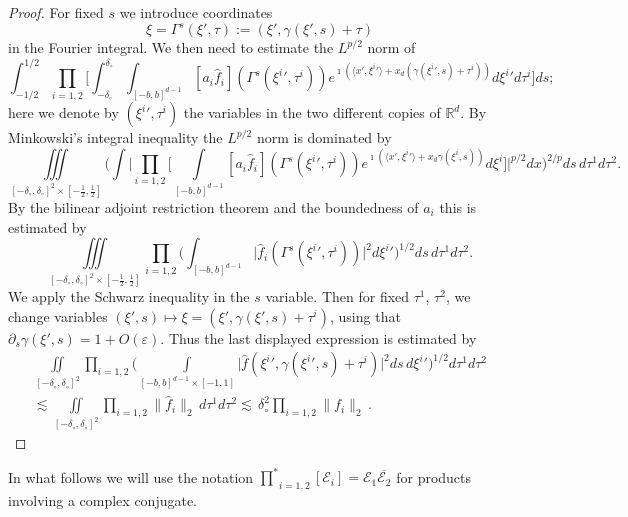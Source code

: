 \documentclass[11pt]{amsart}
\theoremstyle{definition}
\numberwithin{theorem}{section}
\numberwithin{definition}{section}
\def\im{\imath}
\def\prodstartext{{\prod^{*}}_{\!\!i=1,2}}
\def\inn#1#2{\langle#1,#2\rangle}
\newcommand{\note}[1]{\footnote{\texttt{\Small #1}}}
\def\inn#1#2{\langle#1,#2\rangle}
\def\lc{\lesssim}
\def\eps{\varepsilon}
\def\bbR{{\mathbb {R}}}
\def\cE{{\mathcal {E}}}
\begin{document}
\begin{proof} For fixed $s$ we introduce coordinates
 $$\xi=\Gamma^s(\xi',\tau):=(\xi', \gamma(\xi',s)+\tau)$$
in the Fourier integral.
We then need to  estimate the $L^{p/2}$ norm of
$$
\int_{-1/2}^{1/2} \prod_{i=1,2} \biggl[ \int_{-\delta_\circ}^{\delta_\circ}
\int_{[-b,b]^{d-1}}
[a_i\widehat f_i](\Gamma^s({\xi^{i}}',\tau^i))
e^{\im(\inn{x'}{{\xi^i}'}+ x_d( \gamma({{\xi^{i}}'},s)+\tau^i))} d{\xi^{i}}'
d\tau^i\biggr] ds;
$$
here we denote by $({\xi^{i}}',\tau^i)$
the variables  in the two different copies of $\bbR^d$.
By  Minkowski's integral inequality the $L^{p/2}$ norm is dominated by
$$
\iiint\limits_{[-\delta_\circ,\delta_\circ]^2\times [-\frac 12,\frac 12]}
 \Big(\int \Big| \prod_{i=1,2}\Big[\int\limits_{[-b,b]^{d-1}}
 [a_i
\widehat  f_i](\Gamma^s({\xi^{i}}',\tau^i))
e^{\im(\inn{x'}{{\xi^i}'}+x_d \gamma(\xi^{i},s))}
d\xi^i\Big]
\Big|^{p/2} dx\Big)^{2/p}ds \,d\tau^1d\tau^2.
$$
By the bilinear adjoint restriction theorem and the boundedness of $a_i$
this is estimated by
$$\iiint\limits_{[-\delta_\circ,\delta_\circ]^2\times [-\frac 12,\frac 12]}
\prod_{i=1,2}
\Big(\int_{[-b,b]^{d-1}}\big| \widehat f_i(\Gamma^s({\xi^{i}}',\tau^i))
\big|^2 d{\xi^i}'\Big)^{1/2} ds\,d\tau^1 d\tau^2.
$$
We apply the Schwarz inequality in the $s$ variable. Then
 for
fixed $\tau^1$, $\tau^2$, we
 change
 variables $(\xi',s)\mapsto \xi= (\xi',  \gamma(\xi',s)+\tau^i)$, using that
 $\partial_s \gamma(\xi',s)= 1+O(\eps)$.
Thus the last displayed expression is estimated by
\begin{multline*}
 \iint\limits_{[-\delta_\circ,\delta_\circ]^2}
\prod_{i=1,2}
\Big(\int\limits_{[-b,b]^{d-1}\times[-1,1]} \big |\widehat f({\xi^i}',\gamma({\xi^i}',s)+\tau^i)\big|^2 ds\,
d {\xi^i}'\Big)^{1/2} d\tau^1d\tau^2
\\
\lc   \iint\limits_{[-\delta_\circ,\delta_\circ]^2}
 \prod_{i=1,2}\|\widehat f_i\|_2\,d\tau^1d\tau^2
\lc \, \delta_\circ^2 \prod_{i=1,2}\| f_i\|_2\,.
\end{multline*}
\end{proof}

In what follows
we will use the notation
$\prodstartext[\cE_i] = \cE_1\overline{\cE_2}$
for products involving a
complex conjugate.
\end{document}
